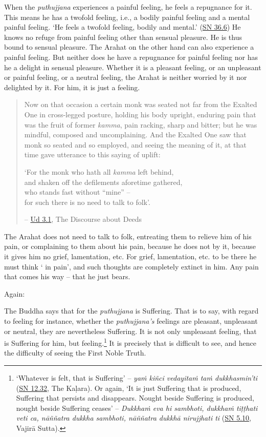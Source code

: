 When the \emph{puthujjana} experiences a painful feeling, he feels a repugnance for it. This means he has a twofold feeling, i.e., a bodily painful feeling and a mental painful feeling. `He feels a twofold feeling, bodily and mental.' (\href{https://suttacentral.net/sn36.6/en/bodhi}{SN 36.6}) He knows no refuge from painful feeling other than sensual pleasure. He is thus bound to sensual pleasure. The Arahat on the other hand can also experience a painful feeling. But neither does he have a repugnance for painful feeling nor has he a delight in sensual pleasure. Whether it is a pleasant feeling, or an unpleasant or painful feeling, or a neutral feeling, the Arahat is neither worried by it nor delighted by it. For him, it is just a feeling.

\begin{quote}
Now on that occasion a certain monk was seated not far from the Exalted One in cross-legged posture, holding his body upright, enduring pain that was the fruit of former \emph{kamma}, pain racking, sharp and bitter; but he was mindful, composed and uncomplaining. And the Exalted One saw that monk so seated and so employed, and seeing the meaning of it, at that time gave utterance to this saying of uplift:

`For the monk who hath all \emph{kamma} left behind,\\
and shaken off the defilements aforetime gathered,\\
who stands fast without ``mine'' --\\
for such there is no need to talk to folk'.

-- \href{https://suttacentral.net/ud3.1/en/anandajoti}{Ud 3.1}, The Discourse about Deeds
\end{quote}

The Arahat does not need to talk to folk, entreating them to relieve him of his pain, or complaining to them about his pain, because he does not  by it, because it gives him no grief, lamentation, etc. For grief, lamentation, etc. to be there he must think ` in pain', and such thoughts are completely extinct in him. Any pain that comes his way -- that he just bears.

\clearpage

Again:

The Buddha says that for the \emph{puthujjana}  is Suffering. That is to say, with regard to feeling for instance, whether the \emph{puthujjana's} feelings are pleasant, unpleasant or neutral, they are nevertheless Suffering. It is not only unpleasant feeling, that is Suffering for him, but  feeling.\footnote{`Whatever is felt, that is Suffering' -- \emph{yaṁ kiñci vedayitaṁ taṁ dukkhasmin'ti} (\href{https://suttacentral.net/sn12.32/en/bodhi}{SN 12.32}, The Kaḷara). Or again, `It is just Suffering that is produced, Suffering that persists and disappears. Nought beside Suffering is produced, nought beside Suffering ceases' -- \emph{Dukkhaṁ eva hi sambhoti, dukkhaṁ tiṭṭhati veti ca, nāññatra dukkha sambhoti, nāññatra dukkhā nirujjhati ti} (\href{https://suttacentral.net/sn5.10/en/bodhi}{SN 5.10}, Vajirā Sutta).} It is precisely  that is difficult to see, and hence the difficulty of seeing the First Noble Truth.

